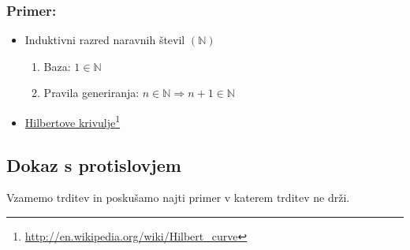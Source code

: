 \documentclass[10pt,a4paper]{article}
\newcommand\fnurl[2]{%
  \href{#2}{#1}\footnote{\url{#2}}%
}
\begin{document}
		\subsubsection*{Primer:}
		\begin{itemize}
		\item Induktivni razred naravnih števil $(\mathbb{N})$
			\begin{enumerate}
			\item Baza: $1 \in \mathbb{N}$ 
			\item Pravila generiranja: $n \in \mathbb{N} \Longrightarrow n+1 \in \mathbb{N} $
			\end{enumerate}
		\item \fnurl{Hilbertove krivulje}{http://en.wikipedia.org/wiki/Hilbert_curve}
	\end{itemize}

\subsection{Dokaz s protislovjem}
	Vzamemo trditev in poskušamo najti primer v katerem trditev ne drži.
\end{document}
